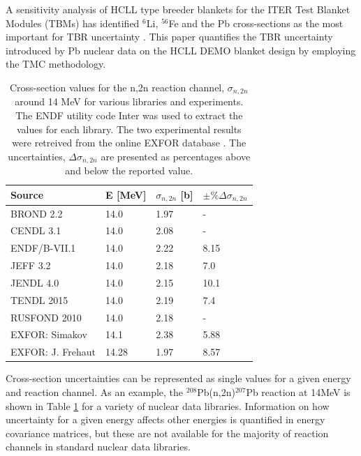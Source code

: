 
A sensitivity analysis of HCLL type breeder blankets for the ITER Test Blanket Modules (TBMs) has identified $^{6}$Li, $^{56}$Fe and the Pb cross-sections as the most important for TBR uncertainty \cite{Leichtle2011}. This paper quantifies the TBR uncertainty introduced by Pb nuclear data on the HCLL DEMO blanket design by employing the TMC methodology.


\begin{table}[ht]
  \footnotesize
  \centering
  \begin{tabular}{llll}
    \toprule
    Source & E [MeV] & $\sigma_{n,2n}$ [b] & $\pm\%\Delta\sigma_{n,2n}$ \\
    \midrule
    BROND 2.2 & 14.0 & 1.97 & - \\
    CENDL 3.1 & 14.0 & 2.08 & - \\
    ENDF/B-VII.1 & 14.0 & 2.22 & 8.15 \\
    JEFF 3.2 & 14.0 & 2.18 & 7.0 \\
    JENDL 4.0 & 14.0 & 2.15 & 10.1 \\
    TENDL 2015 & 14.0 & 2.19 & 7.4 \\
    RUSFOND 2010 & 14.0 & 2.18 & - \\
    EXFOR: Simakov & 14.1 & 2.38 & 5.88 \\
    EXFOR: J. Frehaut & 14.28 & 1.97 & 8.57 \\
    \bottomrule
  \end{tabular}
  \caption{Cross-section values for the n,2n reaction channel, $\sigma_{n,2n}$ around 14 MeV for various libraries and experiments. The ENDF utility code Inter \cite{inter} was used to extract the values for each library. The two experimental results were retreived from the online EXFOR database \cite{exfor2017}. The uncertainties, $\Delta\sigma_{n,2n}$ are presented as percentages above and below the reported value.}
  \label{tab:lead_by_lib}
\end{table}

Cross-section uncertainties can be represented as single values for a given energy and reaction channel. As an example, the $^{208}$Pb(n,2n)$^{207}$Pb reaction at 14MeV is shown in Table \ref{tab:lead_by_lib} for a variety of nuclear data libraries. Information on how uncertainty for a given energy affects other energies is quantified in energy covariance matrices, but these are not available for the majority of reaction channels in standard nuclear data libraries.

